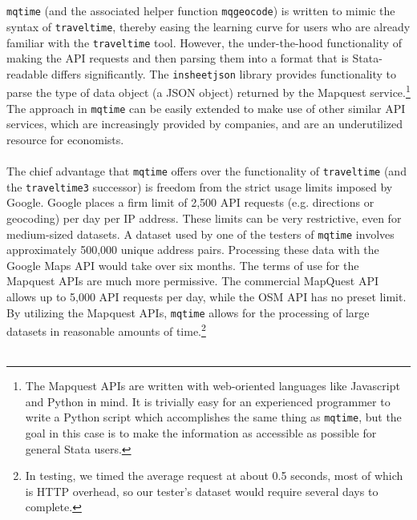 \documentclass[12pt]{article}
\begin{document}
\\ \\
\texttt{mqtime} (and the associated helper function \verb|mqgeocode|) is written to mimic the syntax of \verb|traveltime|, thereby easing the learning curve for users who are already familiar with the \verb|traveltime| tool. However, the under-the-hood functionality of making the API requests and then parsing them into a format that is Stata-readable differs significantly. The \verb|insheetjson| library provides functionality to parse the type of data object (a JSON object) returned by the Mapquest service.\footnote{The Mapquest APIs are written with web-oriented languages like Javascript and Python in mind. It is trivially easy for an experienced programmer to write a Python script which accomplishes the same thing as \texttt{mqtime}, but the goal in this case is to make the information as accessible as possible for general Stata users.} The approach in \verb|mqtime| can be easily extended to make use of other similar API services, which are increasingly provided by companies, and are an underutilized resource for economists. 
\\ \\
The chief advantage that \verb|mqtime| offers over the functionality of \verb|traveltime| (and the \verb|traveltime3| successor) is freedom from the strict usage limits imposed by Google. Google places a firm limit of 2,500 API requests (e.g. directions or geocoding) per day per IP address. These limits can be very restrictive, even for medium-sized datasets. A dataset used by one of the testers of \verb|mqtime| involves approximately 500,000 unique address pairs. Processing these data with the Google Maps API would take over six months. The terms of use for the Mapquest APIs are much more permissive. The commercial MapQuest API allows up to 5,000 API requests per day, while the OSM API has no preset limit. By utilizing the Mapquest APIs, \verb|mqtime| allows for the processing of large datasets in reasonable amounts of time.\footnote{In testing, we timed the average request at about 0.5 seconds, most of which is HTTP overhead, so our tester's dataset would require several days to complete.} 
\\ \\
\end{document}
